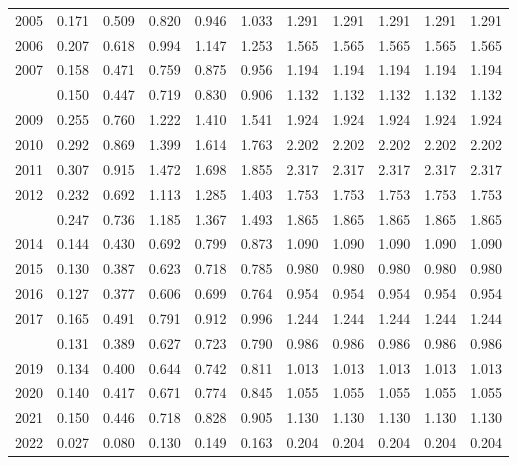 \documentclass[
]{article}
\begin{document}
\begin{longtable}[t]{lrrrrrrrrrr}
2005 & 0.171 & 0.509 & 0.820 & 0.946 & 1.033 & 1.291 & 1.291 & 1.291 & 1.291 & 1.291\\
2006 & 0.207 & 0.618 & 0.994 & 1.147 & 1.253 & 1.565 & 1.565 & 1.565 & 1.565 & 1.565\\
2007 & 0.158 & 0.471 & 0.759 & 0.875 & 0.956 & 1.194 & 1.194 & 1.194 & 1.194 & 1.194\\
\addlinespace
2008 & 0.150 & 0.447 & 0.719 & 0.830 & 0.906 & 1.132 & 1.132 & 1.132 & 1.132 & 1.132\\
2009 & 0.255 & 0.760 & 1.222 & 1.410 & 1.541 & 1.924 & 1.924 & 1.924 & 1.924 & 1.924\\
2010 & 0.292 & 0.869 & 1.399 & 1.614 & 1.763 & 2.202 & 2.202 & 2.202 & 2.202 & 2.202\\
2011 & 0.307 & 0.915 & 1.472 & 1.698 & 1.855 & 2.317 & 2.317 & 2.317 & 2.317 & 2.317\\
2012 & 0.232 & 0.692 & 1.113 & 1.285 & 1.403 & 1.753 & 1.753 & 1.753 & 1.753 & 1.753\\
\addlinespace
2013 & 0.247 & 0.736 & 1.185 & 1.367 & 1.493 & 1.865 & 1.865 & 1.865 & 1.865 & 1.865\\
2014 & 0.144 & 0.430 & 0.692 & 0.799 & 0.873 & 1.090 & 1.090 & 1.090 & 1.090 & 1.090\\
2015 & 0.130 & 0.387 & 0.623 & 0.718 & 0.785 & 0.980 & 0.980 & 0.980 & 0.980 & 0.980\\
2016 & 0.127 & 0.377 & 0.606 & 0.699 & 0.764 & 0.954 & 0.954 & 0.954 & 0.954 & 0.954\\
2017 & 0.165 & 0.491 & 0.791 & 0.912 & 0.996 & 1.244 & 1.244 & 1.244 & 1.244 & 1.244\\
\addlinespace
2018 & 0.131 & 0.389 & 0.627 & 0.723 & 0.790 & 0.986 & 0.986 & 0.986 & 0.986 & 0.986\\
2019 & 0.134 & 0.400 & 0.644 & 0.742 & 0.811 & 1.013 & 1.013 & 1.013 & 1.013 & 1.013\\
2020 & 0.140 & 0.417 & 0.671 & 0.774 & 0.845 & 1.055 & 1.055 & 1.055 & 1.055 & 1.055\\
2021 & 0.150 & 0.446 & 0.718 & 0.828 & 0.905 & 1.130 & 1.130 & 1.130 & 1.130 & 1.130\\
2022 & 0.027 & 0.080 & 0.130 & 0.149 & 0.163 & 0.204 & 0.204 & 0.204 & 0.204 & 0.204\\*
\end{longtable}
\end{document}
